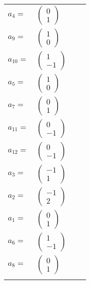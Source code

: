 \documentclass[1p]{elsarticle_modified}
\theoremstyle{definition}
\begin{document}
\begin{tabular}{m{7pt} m{180pt} m{7pt} m{180pt} }
\flushright $a_{4}=$&$\begin{pmatrix}0\\1\end{pmatrix}$ \\
\flushright $a_{9}=$&$\begin{pmatrix}1\\0\end{pmatrix}$ \\
\flushright $a_{10}=$&$\begin{pmatrix}1\\-1\end{pmatrix}$ \\
\flushright $a_{5}=$&$\begin{pmatrix}1\\0\end{pmatrix}$ \\
\flushright $a_{7}=$&$\begin{pmatrix}0\\1\end{pmatrix}$ \\
\flushright $a_{11}=$&$\begin{pmatrix}0\\-1\end{pmatrix}$ \\
\flushright $a_{12}=$&$\begin{pmatrix}0\\-1\end{pmatrix}$ \\
\flushright $a_{3}=$&$\begin{pmatrix}-1\\1\end{pmatrix}$ \\
\flushright $a_{2}=$&$\begin{pmatrix}-1\\2\end{pmatrix}$ \\
\flushright $a_{1}=$&$\begin{pmatrix}0\\1\end{pmatrix}$ \\
\flushright $a_{6}=$&$\begin{pmatrix}1\\-1\end{pmatrix}$ \\
\flushright $a_{8}=$&$\begin{pmatrix}0\\1\end{pmatrix}$\\&\end{tabular}
\end{document}
